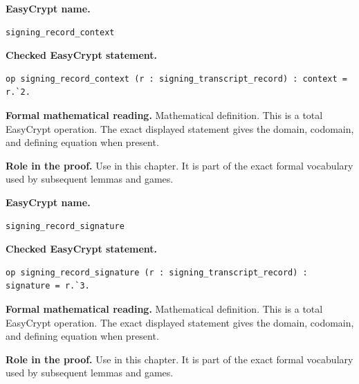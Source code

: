 \begin{formaldefinition}
\noindent\textbf{EasyCrypt name.}
\begin{lstlisting}[language=EasyCrypt,basicstyle=\ttfamily\scriptsize]
signing_record_context
\end{lstlisting}
\noindent\textbf{Checked EasyCrypt statement.}
\begin{lstlisting}[language=EasyCrypt,basicstyle=\ttfamily\scriptsize]
op signing_record_context (r : signing_transcript_record) : context = r.`2.
\end{lstlisting}
\noindent\textbf{Formal mathematical reading.}
Mathematical definition. This is a total EasyCrypt operation.  The exact displayed statement gives the domain, codomain, and defining equation when present.

\noindent\textbf{Role in the proof.}
Use in this chapter. It is part of the exact formal vocabulary used by subsequent lemmas and games.

\end{formaldefinition}

\begin{formaldefinition}
\noindent\textbf{EasyCrypt name.}
\begin{lstlisting}[language=EasyCrypt,basicstyle=\ttfamily\scriptsize]
signing_record_signature
\end{lstlisting}
\noindent\textbf{Checked EasyCrypt statement.}
\begin{lstlisting}[language=EasyCrypt,basicstyle=\ttfamily\scriptsize]
op signing_record_signature (r : signing_transcript_record) : signature = r.`3.
\end{lstlisting}
\noindent\textbf{Formal mathematical reading.}
Mathematical definition. This is a total EasyCrypt operation.  The exact displayed statement gives the domain, codomain, and defining equation when present.

\noindent\textbf{Role in the proof.}
Use in this chapter. It is part of the exact formal vocabulary used by subsequent lemmas and games.

\end{formaldefinition}

